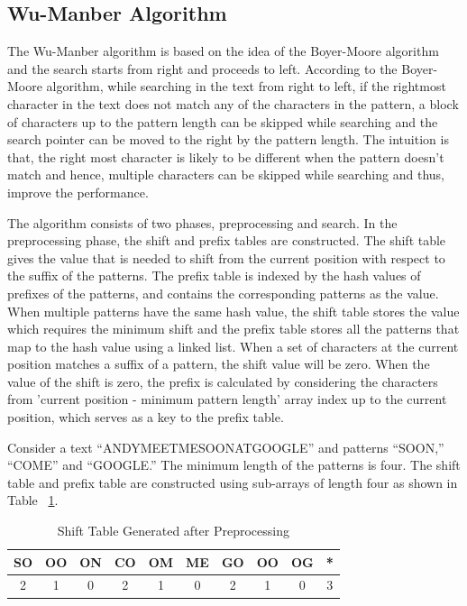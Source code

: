 \subsection{Wu-Manber Algorithm}
The Wu-Manber algorithm \cite{bib16} is based on the idea of the Boyer-Moore algorithm \cite{bib17} and the search starts from right and proceeds to left. According to the Boyer-Moore algorithm, while searching in the text from right to left, if the rightmost character in the text does not match any of the characters in the pattern, a block of characters up to the pattern length can be skipped while searching and the search pointer can be moved to the right by the pattern length. The intuition is that, the right most character is likely to be different when the pattern doesn't match and hence, multiple characters can be skipped while searching and thus, improve the performance.

The algorithm consists of two phases, preprocessing and search. In the preprocessing phase, the shift and prefix tables are constructed. The shift table gives the value that is needed to shift from the current position with respect to the suffix of the patterns. The prefix table is indexed by the hash values of prefixes of the patterns, and contains the corresponding patterns as the value. When multiple patterns have the same hash value, the shift table stores the value which requires the minimum shift and the prefix table stores all the patterns that map to the hash value using a linked list. When a set of characters at the current position matches a suffix of a pattern, the shift value will be zero. When the value of the shift is zero, the prefix is calculated by considering the characters from 'current position - minimum pattern length' array index up to the current position, which serves as a key to the prefix table. 

Consider a text “ANDYMEETMESOONATGOOGLE” and patterns “SOON,” “COME” and “GOOGLE.” The minimum length of the patterns is four. The shift table and prefix table are constructed using sub-arrays of length four as shown in Table ~\ref{tab:shiftwuman}.

\begin {table}[H]
\centering
\caption {Shift Table Generated after Preprocessing} \label{tab:shiftwuman}
\begin{tabular}{|c|c|c|c|c|c|c|c|c|c|}
\midrule
SO &    OO &    ON &    CO &    OM &    ME &    GO &    OO &    OG   &    * \\
\midrule
2 & 1 & 0 & 2 & 1 & 0 & 2 & 1 & 0  & 3\\
\midrule
\end{tabular}
\end{table}
\squeezeup

